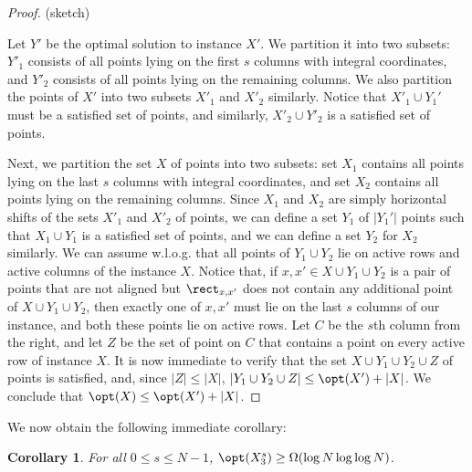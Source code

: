 \documentclass[11pt]{article}
\numberwithin{equation}{section}
\newtheorem{corollary}[theorem]{Corollary}
\theoremstyle{definition}
\theoremstyle{plain}
\begin{document}
\begin{proof}
	(sketch)
	
	Let $Y'$ be the optimal solution to instance $X'$. We partition it into two subsets: $Y'_1$ consists of all points lying on the first $s$ columns with integral coordinates, and $Y'_2$ consists of all points lying on the remaining columns. We also partition the points of $X'$ into two subsets $X'_1$ and $X'_2$ similarly.  Notice that $X'_1\cup Y_1'$ must be a satisfied set of points, and similarly, $X'_2\cup Y'_2$ is a satisfied set of points.
	
	Next, we partition the set $X$ of points into two subsets: set $X_1$ contains all points lying on the last $s$ columns with integral coordinates, and set $X_2$ contains all points lying on the remaining columns. Since $X_1$ and $X_2$ are simply horizontal shifts of the sets $X'_1$ and $X'_2$ of points, we can define a set $Y_1$ of $|Y_1'|$ points such that $X_1\cup Y_1$ is a satisfied set of points, and we can define a set $Y_2$ for $X_2$ similarly. We can assume w.l.o.g. that all points of $Y_1\cup Y_2$ lie on active rows and active columns of the instance $X$. Notice that, if $x,x'\in X\cup Y_1\cup Y_2$ is a pair of points that are not aligned but $\rect_{x,x'}$ does not contain any additional point of $X\cup Y_1\cup Y_2$, then exactly one of $x,x'$ must lie on the last $s$ columns of our instance, and both these points lie on active rows. Let $C$ be the $s$th column from the right, and let $Z$ be the set of point on $C$ that contains a point on every active row of instance $X$. It is now immediate to verify that the set $X\cup Y_1\cup Y_2\cup Z$ of points is satisfied, and, since $|Z|\leq |X|$, $|Y_1\cup Y_2\cup Z|\leq \opt(X')+|X|$. We conclude that $\opt(X)\leq \opt(X')+|X|$.
\end{proof}
	
We now obtain the following immediate corollary:

\begin{corollary}\label{cor: large solution cost for shifted instance}
For all $0\leq s\leq N-1$, $\opt(X_3^s)\geq \Omega(\log N\log\log N)$.
\end{corollary}
\end{document}
